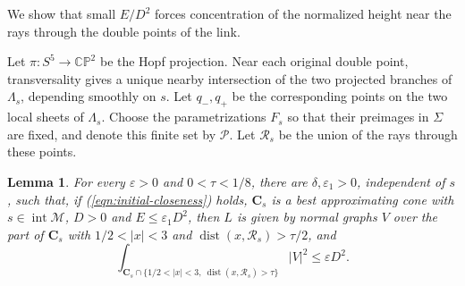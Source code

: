 \documentclass[11pt,a4paper]{article}
\numberwithin{equation}{section}
\newtheorem{lemma}[theorem]{Lemma}
\theoremstyle{definition}
\theoremstyle{remark}
\newcommand{\dist}{\operatorname{dist}}
\begin{document}
	We show that small $E/D^2$ forces concentration of the normalized
	height near the rays through the double points of the link.
	
	Let $\pi:S^5\to\mathbb{CP}^2$ be the Hopf projection. Near each original double point, transversality gives a unique
	nearby intersection of the two projected branches of $\Lambda_s$, depending
	smoothly on $s$. Let $q_-,q_+$ be the corresponding points on the two
	local sheets of $\Lambda_s$.
	Choose the parametrizations $F_s$ so that their preimages in $\Sigma$
	are fixed, and denote this finite set by $\mathcal P$. Let $\mathcal R_s$
	be the union of the rays through these points.
	
	\begin{lemma}\label{lem:nonconcentration}
		For every $\varepsilon>0$ and $0<\tau<1/8$, there are $\delta,\varepsilon_1>0$,
		independent of $s$, such that, if (\ref{eqn:initial-closeness}) holds,
		$\mathbf C_s$ is a best
		approximating cone with $s\in\operatorname{int}\mathcal M$,
		$D>0$ and $E\le\varepsilon_1 D^2$, then
		$L$ is given by normal graphs $V$ over the part of $\mathbf C_s$ with
		$1/2<|x|<3$ and $\dist(x,\mathcal R_s)>\tau/2$, and
		\[
		\int_{\mathbf C_s\cap\{1/2<|x|<3,\ \dist(x,\mathcal R_s)>\tau\}}|V|^2\le\varepsilon D^2.
		\]
	\end{lemma}
	
\end{document}
